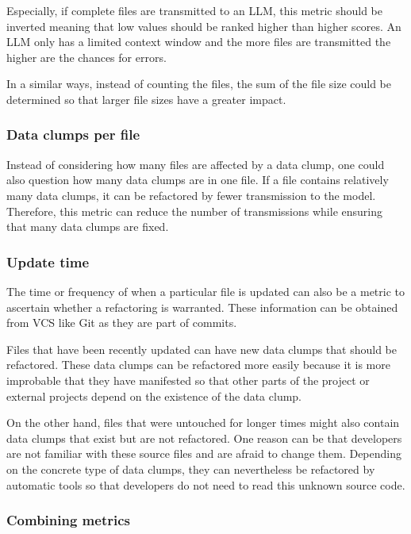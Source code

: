 Especially, if complete files are transmitted to an \ac{LLM}, this metric should be inverted meaning that low values should be ranked higher than higher scores. An \ac{LLM} only has a limited context window and the more files are transmitted the higher are the chances for errors.  

In a similar ways, instead of counting the files, the sum of the file size could be determined so that larger file sizes have a greater impact.

\subsubsection{Data clumps per file}

Instead of considering how many files are affected by a data clump, one could also question how many data clumps are in one file. If a file contains relatively many data clumps, it can be refactored by fewer transmission to the model. Therefore, this metric can reduce the number of transmissions while ensuring that many data clumps are fixed. 

\subsubsection{Update time}

The time or frequency of when a particular file is updated can also be a metric to ascertain whether a refactoring is warranted. These information can be obtained from \ac{VCS} like Git as they are part of commits.

Files that have been recently updated can have new data clumps that should be refactored. These data clumps can be refactored more easily because it is more improbable that they have manifested so that other parts of the project or external projects depend on the existence of the data clump. 

On the other hand, files that were untouched for longer times might also contain data clumps that exist but are not refactored. One reason can be that developers are not familiar with these source files and are afraid to change them. Depending on the concrete type of data clumps, they can nevertheless be refactored by automatic tools so that developers do not need to read this unknown source code.


\subsubsection{Combining metrics}

